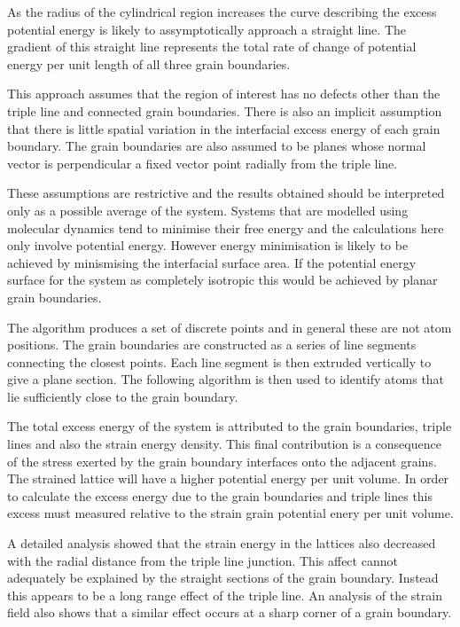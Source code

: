 \documentclass[12pt,a4paper]{book}
\begin{document}
As the radius of the cylindrical region increases the curve describing the excess potential energy is likely to assymptotically approach a straight line. The gradient of this straight line represents the total rate of change of potential energy per unit length of all three grain boundaries. 

This approach assumes that the region of interest has no defects other than the triple line and connected grain boundaries. There is also an implicit assumption that there is little spatial variation in the interfacial excess energy of each grain boundary. The grain boundaries are also assumed to be planes whose normal vector is perpendicular a fixed vector point radially from the triple line.

These assumptions are restrictive and the results obtained should be interpreted only as a possible average of the system. Systems that are modelled using molecular dynamics tend to minimise their free energy and the calculations here only involve potential energy. However energy minimisation is likely to be achieved by minismising the interfacial surface area. If the potential energy surface for the system as completely isotropic this would be achieved by planar grain boundaries.    

The algorithm produces a set of discrete points and in general these are not atom positions. The grain boundaries are constructed as a series of line segments connecting the closest points. Each line segment is then extruded vertically to give a plane section. The following algorithm is then used to identify atoms that lie sufficiently close to the grain boundary.

The total excess energy of the system is attributed to the grain boundaries, triple lines and also the strain energy density. This final contribution is a consequence of the stress exerted by the grain boundary interfaces onto the adjacent grains. The strained lattice will have a higher potential energy per unit volume. In order to calculate the excess energy due to the grain boundaries and triple lines this excess must measured relative to the strain grain potential enery per unit volume. 

A detailed analysis showed that the strain energy in the lattices also decreased with the radial distance from the triple line junction. This affect cannot adequately be explained by the straight sections of the grain boundary. Instead this appears to be a long range effect of the triple line. An analysis of the strain field also shows that a similar effect occurs at a sharp corner of a grain boundary.
 
\end{document}
